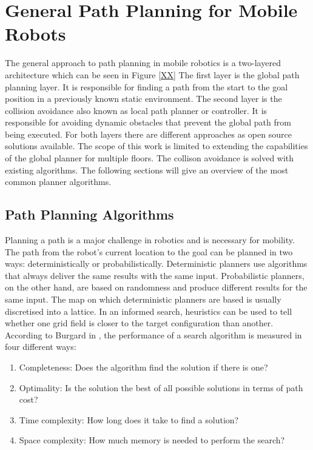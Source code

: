 \section{General Path Planning for Mobile Robots}
\label{sec:path_planning}

The general approach to path planning in mobile robotics is a two-layered architecture which can be seen in Figure \ref{XX}  The first layer is the global path planning layer. It is responsible for finding a path from the start to the goal position in a previously known static environment. The second layer is the collision avoidance also known as local path planner or controller. It is responsible for avoiding dynamic obstacles that prevent the global path from being executed. For both layers there are different approaches as open source solutions available. The scope of this work is limited to extending the capabilities of the global planner for multiple floors. The collison avoidance is solved with existing algorithms. The following sections will give an overview of the most common planner algorithms. 

\subsection{Path Planning Algorithms}
Planning a path is a major challenge in robotics and is necessary for mobility. The path from the robot's current location to the goal can be planned in two ways: deterministically or probabilistically. Deterministic planners use algorithms that always deliver the same results with the same input. Probabilistic planners, on the other hand, are based on randomness and produce different results for the same input. The map on which deterministic planners are based is usually discretised into a lattice. In an informed search, heuristics can be used to tell whether one grid field is closer to the target configuration than another. According to Burgard in \cite{XXBurgard}, the performance of a search algorithm is measured in four different ways:
\begin{enumerate}
    \item Completeness:
    Does the algorithm find the solution if there is one?
    \item Optimality:
    Is the solution the best of all possible solutions in terms of path cost?
    \item Time complexity:
    How long does it take to find a solution?
    \item Space complexity:
    How much memory is needed to perform the search?
\end{enumerate}

